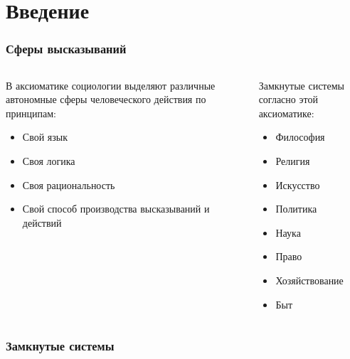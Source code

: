 \section{Введение}
\begin{frame}
    \frametitle{Сферы высказываний}
    \begin{columns}
        \begin{column}{0.5\textwidth}
            В аксиоматике социологии выделяют различные автономные сферы
            человеческого действия по принципам:
            \begin{itemize}[<+->]
                \item Свой язык
                \item Своя логика
                \item Своя рациональность
                \item Свой способ производства высказываний и действий
            \end{itemize}
        \end{column}
        \begin{column}{0.5\textwidth}
            Замкнутые системы согласно этой аксиоматике:
            \begin{itemize}[<+->]
                \item Философия
                \item Религия
                \item Искусство
                \item Политика
                \item Наука
                \item Право
                \item Хозяйствование
                \item Быт
            \end{itemize}
        \end{column}
    \end{columns}
\end{frame}

\begin{frame}
    \frametitle{Замкнутые системы}
    \par\vspace{0.3cm}
\end{frame}


